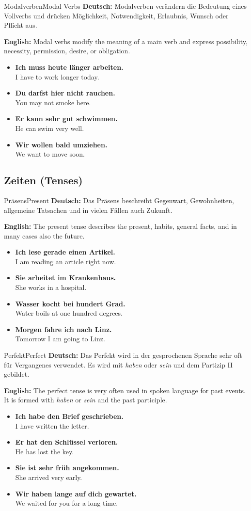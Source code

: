 \documentclass[a4paper,11pt]{article}
\newcommand{\GermanText}[1]{\textbf{Deutsch: }#1\par}
\newcommand{\EnglishText}[1]{{\color{SoftGray}\textbf{English: }#1\par}}
\newcommand{\ExampleItem}[2]{\item \textbf{#1}\\{\color{SoftGray}#2}}
\begin{document}
\begin{grammarentry}{Modalverben}{Modal Verbs}
    \GermanText{Modalverben verändern die Bedeutung eines Vollverbs und drücken Möglichkeit, Notwendigkeit, Erlaubnis, Wunsch oder Pflicht aus.}
    \EnglishText{Modal verbs modify the meaning of a main verb and express possibility, necessity, permission, desire, or obligation.}
    \begin{exbox}
        \begin{itemize}
            \ExampleItem{Ich muss heute länger arbeiten.}{I have to work longer today.}
            \ExampleItem{Du darfst hier nicht rauchen.}{You may not smoke here.}
            \ExampleItem{Er kann sehr gut schwimmen.}{He can swim very well.}
            \ExampleItem{Wir wollen bald umziehen.}{We want to move soon.}
        \end{itemize}
    \end{exbox}
\end{grammarentry}

\subsection{Zeiten {\small (Tenses)}}

\begin{grammarentry}{Präsens}{Present}
    \GermanText{Das Präsens beschreibt Gegenwart, Gewohnheiten, allgemeine Tatsachen und in vielen Fällen auch Zukunft.}
    \EnglishText{The present tense describes the present, habits, general facts, and in many cases also the future.}
    \begin{exbox}
        \begin{itemize}
            \ExampleItem{Ich lese gerade einen Artikel.}{I am reading an article right now.}
            \ExampleItem{Sie arbeitet im Krankenhaus.}{She works in a hospital.}
            \ExampleItem{Wasser kocht bei hundert Grad.}{Water boils at one hundred degrees.}
            \ExampleItem{Morgen fahre ich nach Linz.}{Tomorrow I am going to Linz.}
        \end{itemize}
    \end{exbox}
\end{grammarentry}

\begin{grammarentry}{Perfekt}{Perfect}
    \GermanText{Das Perfekt wird in der gesprochenen Sprache sehr oft für Vergangenes verwendet. Es wird mit \textit{haben} oder \textit{sein} und dem Partizip II gebildet.}
    \EnglishText{The perfect tense is very often used in spoken language for past events. It is formed with \textit{haben} or \textit{sein} and the past participle.}
    \begin{exbox}
        \begin{itemize}
            \ExampleItem{Ich habe den Brief geschrieben.}{I have written the letter.}
            \ExampleItem{Er hat den Schlüssel verloren.}{He has lost the key.}
            \ExampleItem{Sie ist sehr früh angekommen.}{She arrived very early.}
            \ExampleItem{Wir haben lange auf dich gewartet.}{We waited for you for a long time.}
        \end{itemize}
    \end{exbox}
\end{grammarentry}
\end{document}
